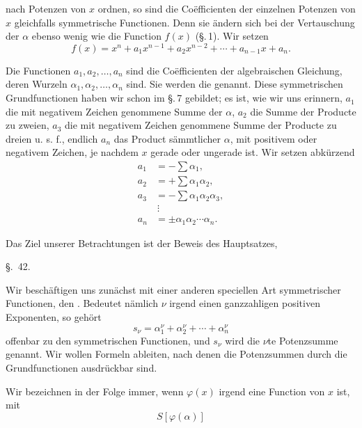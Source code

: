 
nach Potenzen von $x$ ordnen, so sind die Coëfficienten der einzelnen Potenzen von $x$ gleichfalls symmetrische Functionen. Denn sie ändern sich bei der Vertauschung der $\alpha$ ebenso wenig wie die Function $f(x)$ (\S.\,1). Wir setzen
\begin{equation}
 f(x)=x^n+a_1x^{n-1}+a_2x^{n-2}+\cdots+a_{n-1}x+a_n.
\tag{2}
\end{equation}

Die Functionen $a_1,a_2,\ldots,a_n$ sind die Coëfficienten der algebraischen Gleichung, deren Wurzeln $\alpha_1,\alpha_2,\ldots,\alpha_n$ sind. Sie werden die  genannt. Diese symmetrischen Grundfunctionen haben wir schon im \S.\,7 gebildet; es ist, wie wir uns erinnern, $a_1$ die mit negativem Zeichen genommene Summe der $\alpha$, $a_2$ die Summe der Producte zu zweien, $a_3$ die mit negativem Zeichen genommene Summe der Producte zu dreien u. s. f., endlich $a_n$ das Product sämmtlicher $\alpha$, mit positivem oder negativem Zeichen, je nachdem $x$ gerade oder ungerade ist.
Wir setzen abkürzend
\begin{equation}
\begin{aligned}
 a_1&=-\sum \alpha_1,\\
 a_2&=+\sum \alpha_1\alpha_2,\\
 a_3&=-\sum \alpha_1\alpha_2\alpha_3,\\
 &\ \vdots\\
 a_n&=\pm \alpha_1\alpha_2\cdots\alpha_n.
\end{aligned}
\tag{3}
\end{equation}

Das Ziel unserer Betrachtungen ist der Beweis des Hauptsatzes, 

\begin{center}
{\large \S.\ 42.}

\vspace{0.5em}
{\large{}}
\end{center}

Wir beschäftigen uns zunächst mit einer anderen speciellen Art symmetrischer Functionen, den . Bedeutet nämlich $\nu$ irgend einen ganzzahligen positiven Exponenten, so gehört
\begin{equation}
 s_\nu=\alpha_1^\nu+\alpha_2^\nu+\cdots+\alpha_n^\nu
\tag{1}
\end{equation}
offenbar zu den symmetrischen Functionen, und $s_\nu$ wird die $\nu$te Potenzsumme genannt. Wir wollen Formeln ableiten, nach denen die Potenzsummen durch die Grundfunctionen ausdrückbar sind.

Wir bezeichnen in der Folge immer, wenn $\varphi(x)$ irgend eine Function von $x$ ist, mit
\[
 S[\varphi(\alpha)]
\]

